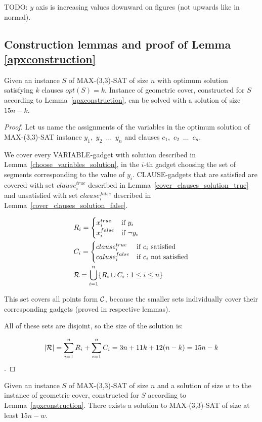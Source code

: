 TODO: $y$ axis is increasing values downward on figures
(not upwards like in normal).



\subsection{Construction lemmas and proof of Lemma \ref{apxconstruction}}
\begin{lemma}
	\label{construction_correctness}
	Given an instance $S$ of MAX-(3,3)-SAT of size $n$
	with optimum solution satisfying $k$ clauses $opt(S) = k$.
	Instance of geometric cover, constructed for $S$
	according to Lemma~\ref{apxconstruction}, 
	can be solved with a solution of size $15n - k$.
\end{lemma}

\begin{proof}
Let us name the assignments of the variables in
the optimum solution of MAX-(3,3)-SAT instance
$y_1$,~$y_2$~$\ldots$~$y_n$ and clauses
$c_1$,~$c_2$~$\ldots$~$c_n$.


We cover every VARIABLE-gadget with solution described in
Lemma~\ref{choose_variables_solution},
in the $i$-th gadget choosing the set of segments corresponding to the
value of $y_i$. 
CLAUSE-gadgets that are satisfied are covered with set $clause_i^{true}$ described in
Lemma~\ref{cover_clauses_solution_true}
and unsatisfied with set $clause_i^{false}$ described in
Lemma~\ref{cover_clauses_solution_false}.


\begin{align}
	\begin{split}
	& R_i = \begin{cases}
		x_i^{true} & \text{if}\ y_i \\
		x_i^{false} & \text{if}\ \neg y_i
		\end{cases} \\
	& C_i = \begin{cases}
		clause_i^{true} & \text{if}\ c_i \text{ satisfied} \\
		caluse_i^{false} & \text{if}\ c_i \text{ not satisfied}
		\end{cases} \\
	& \mathcal{R} = \bigcup\limits_{i=1}^{n} \{R_i \cup C_i : 1 \le i \le n\}
    \end{split}
\end{align}


This set covers all points form $\mathcal{C}$, because
the smaller sets individually cover their corresponding gadgets
(proved in respective lemmas).

All of these sets are disjoint, so the size of the solution is:

$$|\mathcal{R}| = \sum_{i=1}^{n} R_i + \sum_{i=1}^n C_i = 3n + 11k + 12(n-k) = 15n - k$$.

\end{proof}
\begin{lemma}
	\label{construction_completness}
	Given an instance $S$ of MAX-(3,3)-SAT of size $n$
	and a solution of size $w$ to the instance of geometric cover,
	constructed	for $S$ according to Lemma~\ref{apxconstruction}.
	There exists a solution to MAX-(3,3)-SAT of size at least $15n - w$.
\end{lemma}

